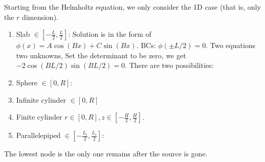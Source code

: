 \documentclass{school-22.211-notes}
\date{March 21, 2012}
\begin{document}
\maketitle

Starting from the Helmholtz equation, we only consider the 1D case (that is, only the $r$ dimension).
\begin{enumerate}
\item Slab $\in  \left[- \frac{L}{2}, \frac{L}{2} \right]$:
  Solution is in the form of $\phi(x) = A \cos (Bx) + C \sin(Bx)$. BCs: $\phi(\pm L/2) = 0$. Two equations two unknowns, 
  Set the determinant to be zero, we get $-2 \cos (BL/2) \sin (BL/2) = 0$. There are two possibilities: 
  
\item Sphere $\in [0, R]$:
\item Infinite cylinder $\in [0, R]$
\item Finite cylinder $r \in [0, R], z \in \left[ -\frac{H}{2}, \frac{H}{2} \right]$. 
\item Parallelepiped $\in \left[ -\frac{L_i}{2}, \frac{L_i}{2} \right]$: 
\end{enumerate}
The lowest node is the only one remains after the source is gone. 
\end{document}
